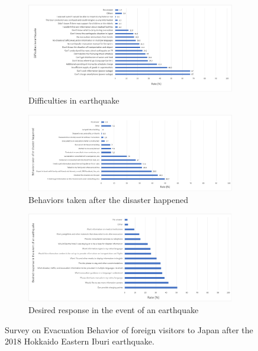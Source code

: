 \begin{figure}[h]
  \begin{subfigure}{\textwidth}
    \includegraphics[width=\linewidth]{Figure/Figure2a.png}
    \caption{Difficulties in earthquake}
    \label{fig2a}
  \end{subfigure}
  \begin{subfigure}{\textwidth}
    \includegraphics[width=\linewidth]{Figure/Figure2b.png}
    \caption{Behaviors taken after the disaster happened}
    \label{fig2b}
  \end{subfigure}
  \begin{subfigure}{\textwidth}
    \includegraphics[width=\linewidth]{Figure/Figure2c.png}
    \caption{Desired response in the event of an earthquake}
    \label{fig2c}
  \end{subfigure}
  \centering
  \caption[Survey on Evacuation Behavior of foreign visitors to Japan after the 2018 Hokkaido Eastern Iburi earthquake.]{Survey on Evacuation Behavior of foreign visitors to Japan after the 2018 Hokkaido Eastern Iburi earthquake.\protect\footnotemark }
  \label{fig2}
\end{figure}
